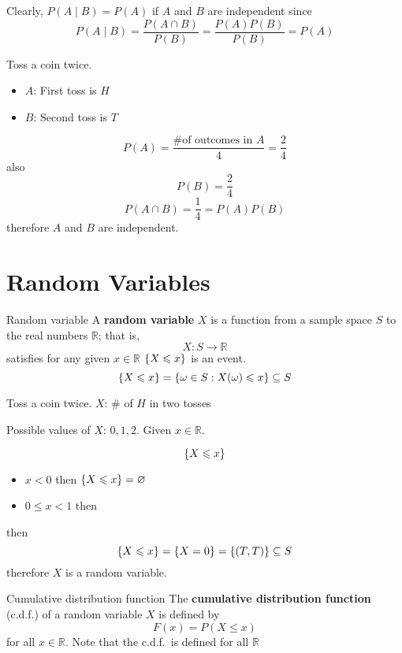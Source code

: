 Clearly, $ P(A\mid B)=P(A) $ if $ A $ and $ B $ are independent since
\[ P(A\mid B)=\frac{P(A\cap B)}{P(B)}=\frac{P(A)P(B)}{P(B)}=P(A)  \]

\begin{Example}{}{}
    Toss a coin twice.
    \begin{itemize}
        \item $ A $: First toss is $ H $
        \item $ B $: Second toss is $ T $
    \end{itemize}
    \[ P(A)=\frac{\text{\# of outcomes in }A}{4}=\frac{2}{4}  \]
    also
    \[ P(B)=\frac{2}{4} \]
    \[ P(A\cap B)=\frac{1}{4}=P(A)P(B) \]
    therefore $ A $ and $ B $ are independent.
\end{Example}

\section{Random Variables}

\begin{Definition}{Random variable}{}
    A \textbf{random variable} $ X $
    is a function from a sample space $ S $ to the real numbers $ \mathbb{R} $; that is,
    \[ X:S\to \mathbb{R} \] satisfies for any given $ x\in\mathbb{R} $
    $ \{X\leqslant x\} $ is an event.
    \[ \{X\leqslant x\}=\{\omega\in S:X(\omega)\leqslant x\}
        \subseteq S \]
\end{Definition}

\begin{Example}{}{}
    Toss a coin twice. $ X $: \# of $ H $ in two tosses

    Possible values of $ X $: $ 0,1,2 $. Given $ x\in\mathbb{R} $.

    \[ \{X\leqslant x\} \]
    \begin{itemize}
        \item $ x<0 $ then $ \{X\leqslant x\}= \varnothing $
        \item $ 0\leqslant x<1 $ then
    \end{itemize}
    then
    \[ \{X\leqslant x\}=\{X=0\}=\{(T,T)\}\subseteq S \]
    therefore $ X $ is a random variable.
\end{Example}

\begin{Definition}{Cumulative distribution function}{}
    The \textbf{cumulative distribution function} (c.d.f.) of a random variable
    $ X $ is defined by
    \[ F(x)=P(X\leqslant x) \]
    for all $ x\in\mathbb{R} $. Note that the c.d.f.\ is defined for all $ \mathbb{R} $
\end{Definition}

